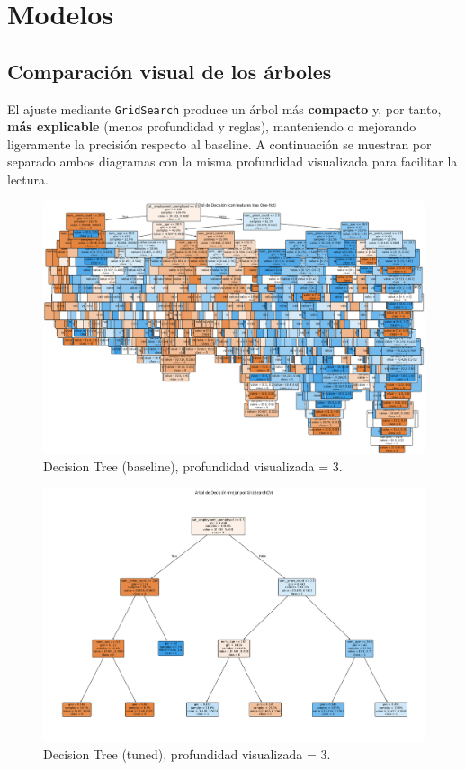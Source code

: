 \section{Modelos}

\subsection{Comparación visual de los árboles}
El ajuste mediante \texttt{GridSearch} produce un árbol más \textbf{compacto} y, por tanto, \textbf{más explicable} (menos profundidad y reglas), manteniendo o mejorando ligeramente la precisión respecto al baseline. A continuación se muestran por separado ambos diagramas con la misma profundidad visualizada para facilitar la lectura.

\begin{figure}[h]
  \centering
  \includegraphics[width=0.92\linewidth]{figures/decision_tree_baseline_depth.png}
  \caption{Decision Tree (baseline), profundidad visualizada = 3.}
  \label{fig:tree-base}
\end{figure}

\begin{figure}[h]
  \centering
  \includegraphics[width=0.92\linewidth]{figures/decision_tree_tunned_depth.png}
  \caption{Decision Tree (tuned), profundidad visualizada = 3.}
  \label{fig:tree-tuned}
\end{figure}


